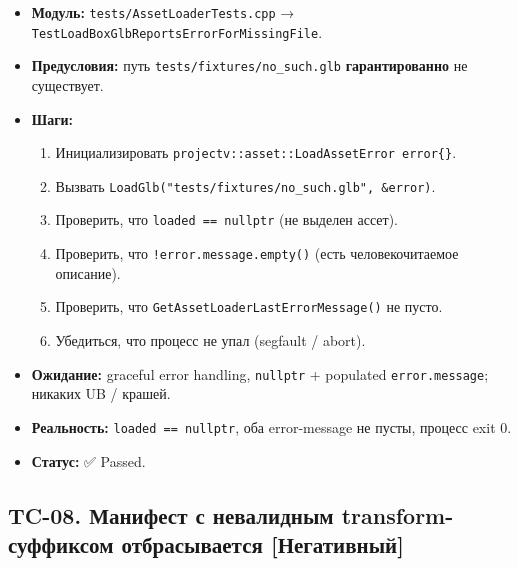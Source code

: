 \documentclass[
  11pt,a4paper,oneside]{article}
\providecommand{\tightlist}{%
  \setlength{\itemsep}{0pt}\setlength{\parskip}{0pt}}
\providecommand{\tightlist}{%
  \setlength{\itemsep}{0pt}\setlength{\parskip}{0pt}}
\begin{document}
\begin{itemize}
\tightlist
\item
  \textbf{Модуль:} \texttt{tests/AssetLoaderTests.cpp} → \texttt{TestLoadBoxGlbReportsErrorForMissingFile}.
\item
  \textbf{Предусловия:} путь \texttt{tests/fixtures/no\_such.glb} \textbf{гарантированно} не существует.
\item
  \textbf{Шаги:}

  \begin{enumerate}
  \def\labelenumi{\arabic{enumi}.}
  \tightlist
  \item
    Инициализировать \texttt{projectv::asset::LoadAssetError\ error\{\}}.
  \item
    Вызвать \texttt{LoadGlb("tests/fixtures/no\_such.glb",\ \&error)}.
  \item
    Проверить, что \texttt{loaded\ ==\ nullptr} (не выделен ассет).
  \item
    Проверить, что \texttt{!error.message.empty()} (есть человекочитаемое описание).
  \item
    Проверить, что \texttt{GetAssetLoaderLastErrorMessage()} не пусто.
  \item
    Убедиться, что процесс не упал (segfault / abort).
  \end{enumerate}
\item
  \textbf{Ожидание:} graceful error handling, \texttt{nullptr} + populated \texttt{error.message}; никаких UB / крашей.
\item
  \textbf{Реальность:} \texttt{loaded\ ==\ nullptr}, оба error-message не пусты, процесс exit 0.
\item
  \textbf{Статус:} ✅ Passed.
\end{itemize}

\subsection{TC-08. Манифест с невалидным transform-суффиксом отбрасывается {[}Негативный{]}}\label{tc-08-ux43cux430ux43dux438ux444ux435ux441ux442-ux441-ux43dux435ux432ux430ux43bux438ux434ux43dux44bux43c-transform-ux441ux443ux444ux444ux438ux43aux441ux43eux43c-ux43eux442ux431ux440ux430ux441ux44bux432ux430ux435ux442ux441ux44f-ux43dux435ux433ux430ux442ux438ux432ux43dux44bux439}
\end{document}
